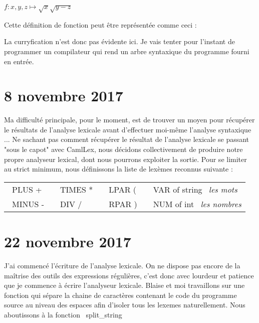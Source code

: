 \documentclass{report}
\begin{document}
\begin{center}
$ f:x,y,z \longmapsto \sqrt{x} \sqrt{y-z} $
\end{center}

Cette définition de fonction peut être représentée comme ceci :

\begin{center}
\end{center}

La curryfication n'est donc pas évidente ici. Je vais tenter pour l'instant de programmer un compilateur qui rend un arbre syntaxique du programme fourni en entrée.

\section{8 novembre 2017}

Ma difficulté principale, pour le moment, est de trouver un moyen pour récupérer le résultats de l'analyse lexicale avant d'effectuer moi-même l'analyse syntaxique ...
Ne sachant pas comment récupérer le résultat de l'analyse lexicale se passant "sous le capot" avec CamlLex, nous décidons collectivement de produire notre propre analyseur lexical, dont nous pourrons exploiter la sortie.
Pour se limiter au strict minimum, nous définissons la liste de lexèmes reconnus suivante :


\begin{center}
\begin{tabular}{llll}
   ~PLUS +~ & ~TIMES *~ & ~LPAR (~ & ~VAR of string~ \textit{les mots} \\
   ~MINUS -~ & ~DIV /~ & ~RPAR  )~ & ~NUM of int~ \textit{les nombres}\\
\end{tabular}
\end{center}

\section{22 novembre 2017}
J'ai commencé l'écriture de l'analyse lexicale. On ne dispose pas encore de la maîtrise des outils des expressions régulières, c'est donc avec lourdeur et patience que je commence à écrire l'analyseur lexicale.
Blaise et moi travaillons sur une fonction qui sépare la chaine de caractères contenant le code du programme source au niveau des espaces afin d'isoler tous les lexemes naturellement. Nous aboutissons à la fonction ~split_string~ \footnotemark[1]
\end{document}

